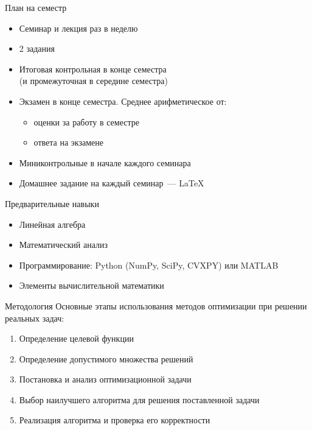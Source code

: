 \documentclass[12pt]{beamer}
\begin{document}
\begin{frame}{План на семестр}
\begin{itemize}
\item Семинар и лекция раз в неделю
\item 2 задания
\item Итоговая контрольная в конце семестра \\ (и промежуточная в середине семестра)
\item Экзамен в конце семестра. Среднее арифметическое от:
\begin{itemize}
\item оценки за работу в семестре
\item ответа на экзамене
\end{itemize}
\item Миниконтрольные в начале каждого семинара
\item Домашнее задание на каждый семинар~--- \LaTeX
\end{itemize}
\end{frame}

\begin{frame}{Предварительные навыки}
\begin{itemize}
\item Линейная алгебра
\item Математический анализ
\item Программирование: Python (NumPy, SciPy, CVXPY) или MATLAB
\item Элементы вычислительной математики
\end{itemize}
\end{frame}

\begin{frame}{Методология}
Основные этапы использования методов оптимизации при решении реальных задач:
\begin{enumerate}
\item Определение целевой функции
\item Определение допустимого множества решений
\item Постановка и анализ оптимизационной задачи
\item Выбор наилучшего алгоритма для решения поставленной задачи
\item Реализация алгоритма и проверка его корректности
\end{enumerate}

\end{frame}
\end{document}
